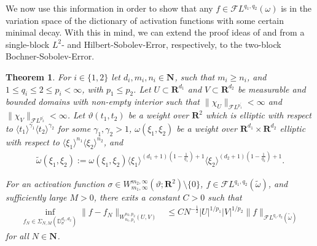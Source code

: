 \documentclass[a4paper]{article}
\newcommand{\nn}[1]{\mathbf{N}^{#1}}
\newcommand{\rr}[1]{\mathbf{R}^{#1}}
\newcommand{\rrI}{\rr{d_1}}
\newcommand{\rrII}{\rr{d_2}}
\newcommand{\rrIxII}{\rrI\times\rrII}
\newcommand{\eabs}[1]{\langle #1\rangle}     %
\newcommand{\abs}[1]{| #1|}     %
\newcommand{\norm}[2]{\|#1\|_{#2}}
\newcommand{\F}[0]{\mathscr{F}}
\newcommand{\FL}[1]{\F L^{#1}}
\newcommand{\chF}[1]{\chi_{#1}}
\numberwithin{equation}{section}
\newtheorem{theorem}{Theorem}[section]
\theoremstyle{remark}
\begin{document}
We now use this information in order to show that any \(f\in \FL{q_1,q_2}(\omega)\) is in the variation space of the dictionary of activation functions with some certain minimal decay.
With this in mind, we can extend the proof ideas of
\cite{Barron93UniversalApproximationBounds} and \cite{Siegel20ApproximationRatesNeural}
from a single-block $L^2$- and Hilbert-Sobolev-Error, respectively, to the two-block Bochner-Sobolev-Error.

\begin{theorem}
\label{thm:approximation_sobolev_space}
    For $i\in\{1,2\}$ let $d_i,m_i,n_i \in\nn{}$,
    such that \(m_i\geq n_i\),
    and $1\leq q_i\leq 2\leq p_i< \infty$,
    with $p_1\leq p_2$.
    Let $U\subset\rrI$ and $V\subset\rrII$ be measurable and bounded domains
    with non-empty interior such that $\norm{\chF{U}}{\FL{p_1^\prime}}<\infty$
    and $\norm{\chF{V}}{\FL{p_2^\prime}}<\infty$.
    Let $\vartheta(t_1,t_2)$ be a weight over $\rr{2}$ which is
    elliptic with respect to $\eabs{t_1}^{\gamma_1}\eabs{t_2}^{\gamma_2}$ for some $\gamma_1,\gamma_2>1$,
    $\omega(\xi_1, \xi_2)$ be a weight over $\rrIxII$
    elliptic with respect to $\eabs{\xi_1}^{n_1}\eabs{\xi_2}^{n_2}$,
    and
    \begin{align*}
        \tilde{\omega}(\xi_1,\xi_2):=
            \omega(\xi_1,\xi_2)
            \eabs{\xi_1}^{(d_1+1)(1-\frac{1}{q_1})+1}
            \eabs{\xi_2}^{(d_2+1)(1-\frac{1}{q_2})+1}.
    \end{align*}

    For an activation function
    $\sigma\in W_{m_1,\infty}^{m_2,\infty}(\vartheta;\rr{2}){\setminus}\{0\}$,
    $f\in\FL{q_1,q_2}(\tilde{\omega})$,
    and sufficiently large $M>0$,
    there exits a constant $C>0$ such that
    \begin{align}
    \label{eq:approximation_bound}
        \inf_{f_{N}\in\Sigma_{N,M}(\mathbb{D}_\sigma^{d_1,d_2})}\norm{f-f_N}{W_{n_1,p_1}^{n_2,p_2}(U,V)}
        &\leq C N^{-\frac{1}{2}} \abs{U}^{1/p_1} \abs{V}^{1/p_2}
        \norm{f}{\FL{q_1,q_2}(\tilde{\omega})}
    \end{align}
    for all $N\in\nn{}$.
\end{theorem}
\end{document}
